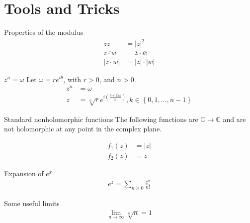 \documentclass{article}
\begin{document}

\tableofcontents

\newpage

\section{Tools and Tricks}

\begin{misc}{Properties of the modulus}{}
\begin{align*}
    z\overline{z} &= \left\lvert z \right\rvert ^{2} \\
    \overline{z\cdot w}&= \overline{z} \cdot \overline{w}  \\
    \left\lvert z\cdot w \right\rvert &= \left\lvert z \right\rvert \cdot \left\lvert w \right\rvert 
\end{align*}

\end{misc}

\begin{misc}{\( z^n = \omega  \) }{}
Let \( \omega = re^{i \theta } \), with \( r>0 \), and \( n>0 \).
\begin{align*}
    z^n &= \omega \\
    z &= \sqrt[n]{r} e^{i (\frac{\theta + 2\pi k}{n}) }, k \in \left\{ 0,1, \dots , n - 1 \right\} 
\end{align*}

\end{misc}

\begin{misc}{Standard nonholomorphic functions}{}
The following functions are \( \mathbb{C} \to \mathbb{C}  \) and are not holomorphic at any point in the complex plane. 

\begin{align*}
    f_1(z) &= |z|\\
    f_2(z) &= \overline{z} 
\end{align*}

\end{misc}

\begin{misc}{Expansion of \( e^x \) }{}
\begin{align*}
    e^z = \sum_{n \geq 0} \frac{z^n}{n!}
\end{align*}

\end{misc}

\begin{misc}{Some useful limits}{}
\begin{align*}
    \lim_{n \to \infty} \sqrt[n]{n} = 1
\end{align*}

\end{misc}
\end{document}
